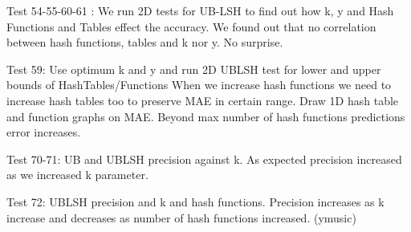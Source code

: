 Test 54-55-60-61 :
We run 2D tests for UB-LSH to find out how k, y and Hash Functions and Tables effect the accuracy.
We found out that no correlation between hash functions, tables and k nor y.
 No surprise.


Test 59: Use optimum k and y and run 2D UBLSH test for lower and upper bounds of HashTables/Functions
When we increase hash functions we need to increase hash tables too to preserve MAE in  certain range.
Draw 1D hash table and function graphs on MAE. Beyond max number of hash functions predictions error increases.


Test 70-71: UB and UBLSH precision against k. As expected precision increased as we increased k parameter.

Test 72: UBLSH precision and k and hash functions.
Precision increases as k increase and decreases as number of hash functions increased. (ymusic)





